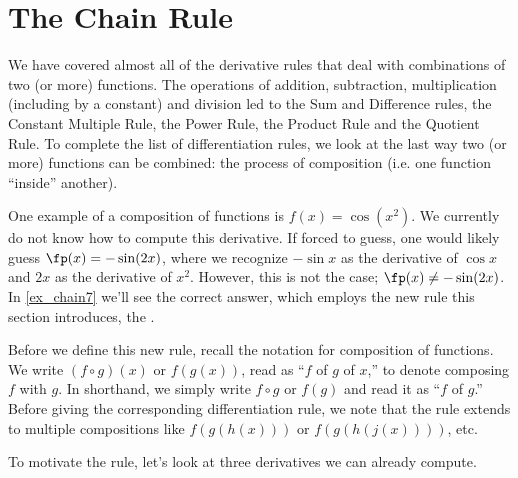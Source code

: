 
\section{The Chain Rule}\label{sec:chainrule}

We have covered almost all of the derivative rules that deal with combinations of two (or more) functions.  The operations of addition, subtraction, multiplication (including by a constant) and division led to the Sum and Difference rules, the Constant Multiple Rule, the Power Rule, the Product Rule and the Quotient Rule.  %
To complete the list of differentiation rules, we look at the last way two (or more) functions can be combined: the process of composition (i.e. one function ``inside''  another).

One example of a composition of functions is $f(x) = \cos(x^2)$. We currently do not know how to compute this derivative. If forced to guess, one would likely guess $\fp(x) = -\sin(2x)$, where we recognize $-\sin x$ as the derivative of $\cos x$ and $2x$ as the derivative of $x^2$. However, this is not the case; $\fp(x)\neq -\sin(2x)$. In \autoref{ex_chain7} we'll see the correct answer, which employs the new rule this section introduces, the . 

Before we define this new rule, recall the notation for composition of functions. We write $(f \circ g)(x)$ or $f(g(x))$, read as ``$f$ of $g$ of $x$,'' to denote composing $f$ with $g$.  In shorthand, we simply write
$f \circ g$ or $f(g)$ and read it as ``$f$ of $g$.''  Before giving the corresponding differentiation rule, we note that the rule extends to multiple compositions like $f(g(h(x)))$ or $f(g(h(j(x))))$, etc.

To motivate the rule, let's look at three derivatives we can already compute.

